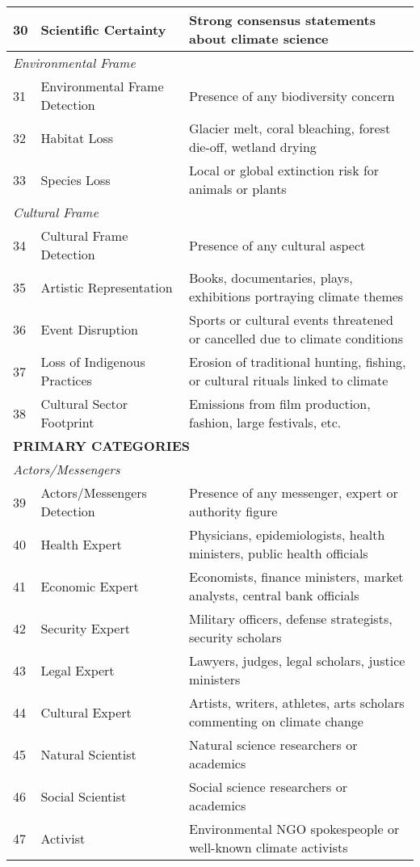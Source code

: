\documentclass[12pt]{article}
\begin{document}
{\begin{longtable}{p{0.5cm}p{5cm}p{16cm}}
30 & Scientific Certainty & Strong consensus statements about climate science \\
\midrule
\multicolumn{3}{l}{\textit{Environmental Frame}} \\
31 & Environmental Frame Detection & Presence of any biodiversity concern \\
32 & Habitat Loss & Glacier melt, coral bleaching, forest die-off, wetland drying \\
33 & Species Loss & Local or global extinction risk for animals or plants \\
\midrule
\multicolumn{3}{l}{\textit{Cultural Frame}} \\
34 & Cultural Frame Detection & Presence of any cultural aspect \\
35 & Artistic Representation & Books, documentaries, plays, exhibitions portraying climate themes \\
36 & Event Disruption & Sports or cultural events threatened or cancelled due to climate conditions \\
37 & Loss of Indigenous Practices & Erosion of traditional hunting, fishing, or cultural rituals linked to climate \\
38 & Cultural Sector Footprint & Emissions from film production, fashion, large festivals, etc. \\
\midrule
\multicolumn{3}{l}{\cellcolor{gray!10}\textbf{PRIMARY CATEGORIES}} \\
\midrule
\multicolumn{3}{l}{\textit{Actors/Messengers}} \\
39 & Actors/Messengers Detection & Presence of any messenger, expert or authority figure \\
40 & Health Expert & Physicians, epidemiologists, health ministers, public health officials \\
41 & Economic Expert & Economists, finance ministers, market analysts, central bank officials \\
42 & Security Expert & Military officers, defense strategists, security scholars \\
43 & Legal Expert & Lawyers, judges, legal scholars, justice ministers \\
44 & Cultural Expert & Artists, writers, athletes, arts scholars commenting on climate change \\
45 & Natural Scientist & Natural science researchers or academics \\
46 & Social Scientist & Social science researchers or academics \\
47 & Activist & Environmental NGO spokespeople or well-known climate activists \\

\end{longtable}}
\end{document}
